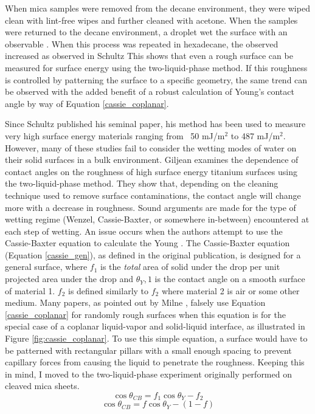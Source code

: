 When mica samples were removed from the decane environment, they were wiped clean with lint-free wipes and further cleaned with acetone. When the samples were returned to the decane environment, a droplet wet the surface with an observable \ca. When this process was repeated in hexadecane, the observed \ca increased as observed in Schultz \etal This shows that even a rough surface can be measured for surface energy using the two-liquid-phase method. If this roughness is controlled by patterning the surface to a specific geometry, the same trend can be observed with the added benefit of a robust calculation of Young's contact angle by way of Equation \ref{cassie_coplanar}. 

Since Schultz published his seminal paper, his method has been used to measure very high surface energy materials ranging from ~50 mJ/m$^{2}$ to 487 mJ/m$^{2}$.\cite{Nakamura2015} However, many of these studies fail to consider the wetting modes of water on their solid surfaces in a bulk \nalk environment. Giljean \etal examines the dependence of contact angles on the roughness of high surface energy titanium surfaces using the two-liquid-phase method. They show that, depending on the cleaning technique used to remove surface contaminations, the contact angle will change more with a decrease in roughness. Sound arguments are made for the type of wetting regime (Wenzel, Cassie-Baxter, or somewhere in-between) encountered at each step of wetting. An issue occurs when the authors attempt to use the Cassie-Baxter equation to calculate the Young \ca. The Cassie-Baxter equation (Equation \ref{cassie_gen}), as defined in the original publication,\cite{Cassie1944} is designed for a general surface, where $f_1$ is the \textit{total} area of solid under the drop per unit projected area under the drop and $\theta_Y,1$ is the contact angle on a smooth surface of material 1. $f_2$ is defined similarly to $f_2$ where material 2 is air or some other medium. Many papers, as pointed out by Milne \etal,\cite{Milne2012} falsely use Equation \ref{cassie_coplanar} for randomly rough surfaces when this equation is for the special case of a coplanar liquid-vapor and solid-liquid interface, as illustrated in Figure \ref{fig:cassie_coplanar}. To use this simple equation, a surface would have to be patterned with rectangular pillars with a small enough spacing to prevent capillary forces from causing the liquid to penetrate the roughness. Keeping this in mind, I moved to the two-liquid-phase experiment originally performed on cleaved mica sheets. 
\begin{equation}
\label{cassie_gen}	
\cos\theta_{CB} = f_{1}\cos\theta_{Y} - f_{2}
\end{equation}
\begin{equation}
\label{cassie_coplanar}	
\cos\theta_{CB} = f\cos\theta_{Y} - (1-f)
\end{equation}

